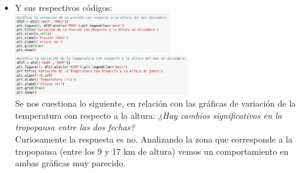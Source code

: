 \documentclass{article}
\begin{document}
\begin{doublespace}
\begin{itemize}
\item Y sus respectivos códigos:
\\
	\includegraphics[height=1.7cm]{act38.png}  \hspace*{\fill}
    \includegraphics[height=1.7cm]{act310.png}
      \\
Se nos cuestiona lo siguiente, en relación con las gráficas de variación de la temperatura con respecto a la altura: \textit{¿Hay cambios significativos en la tropopausa entre las dos fechas?}
\\
Curiosamente la respuesta es no. Analizando la zona que corresponde a la tropopausa (entre los 9 y 17 km de altura) vemos un comportamiento en ambas gráficas muy parecido.



\end{itemize}
\end{doublespace}
\end{document}
